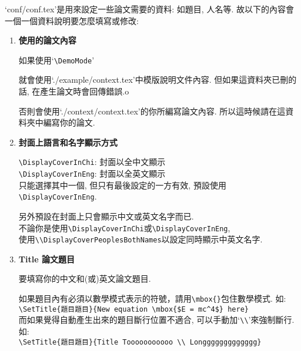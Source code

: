 
`conf/conf.tex'是用來設定一些論文需要的資料: 如題目, 人名等. 故以下的內容會一個一個資料說明要怎麼填寫或修改:

\begin{enumerate}
  \item
  {
    \textbf{使用的論文內容}

    如果使用`\verb|\DemoMode|'

    就會使用`./example/context.tex'中模版說明文件內容. 但如果這資料夾已刪的話, 在產生論文時會回傳錯誤.o

    否則會使用`./context/context.tex'的你所編寫論文內容. 所以這時候請在這資料夾中編寫你的論文.
  } %

  \item
  {
    \textbf{封面上語言和名字顯示方式}

    \verb|\DisplayCoverInChi|:  封面以全中文顯示\\
    \verb|\DisplayCoverInEng|:  封面以全英文顯示\\
    只能選擇其中一個, 但只有最後設定的一方有效, 預設使用\verb|\DisplayCoverInEng|.

    另外預設在封面上只會顯示中文或英文名字而已.\\
    不論你是使用\verb|\DisplayCoverInChi|或\verb|\DisplayCoverInEng|,\\
    使用\verb|\\DisplayCoverPeoplesBothNames|以設定同時顯示中英文名字.
  } %

  \item
  {
    \textbf{Title 論文題目}

    要填寫你的中文和(或)英文論文題目.

    如果題目內有必須以數學模式表示的符號，請用\verb|\mbox{}|包住數學模式. 如:\\
    \verb|\SetTitle{題目題目}{New equation \mbox{$E = mc^4$} here}|\\

    而如果覺得自動產生出來的題目斷行位置不適合, 可以手動加`\verb|\\|'來強制斷行. 如:\\
    \verb|\SetTitle{題目題目}{Title Tooooooooooo \\ Longgggggggggggg}|\\

}
\end{enumerate}
